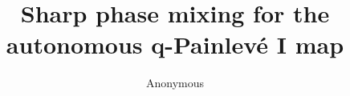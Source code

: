 \documentclass[11pt,letterpaper]{article}
\title{Sharp phase mixing for the autonomous q-Painlev\'e I map}
\author{Anonymous}
\date{}
\begin{document}
\maketitle
\begin{abstract}

\end{abstract}








\label{LastBodyPage}
\clearpage


\end{document}
